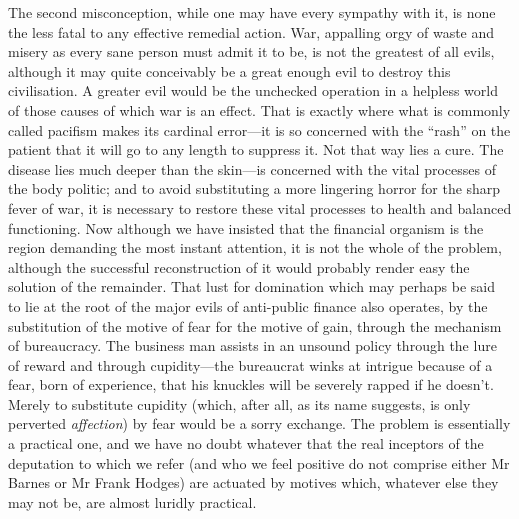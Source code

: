 \documentclass{book}
\begin{document}
The second misconception, while one may have every sympathy with it, is none the less fatal to any effective remedial action. War, appalling orgy of waste and misery as every sane person must admit it to be, is not the greatest of all evils, although it may quite conceivably be a great enough evil to destroy this civilisation. A greater evil would be the unchecked operation in a helpless world of those causes of which war is an effect. That is exactly where what is commonly called pacifism makes its cardinal error—it is so concerned with the “rash” on the patient that it will go to any length to suppress it. Not that way lies a cure. The disease lies much deeper than the skin—is concerned with the vital processes of the body politic; and to avoid substituting a more lingering horror for the sharp fever of war, it is necessary to restore these vital processes to health and balanced functioning. Now although we have insisted that the financial organism is the region demanding the most instant attention, it is not the whole of the problem, although the successful reconstruction of it would probably render easy the solution of the remainder. That lust for domination which may perhaps be said to lie at the root of the major evils of anti-public finance also operates, by the substitution of the motive of fear for the motive of gain, through the mechanism of bureaucracy. The business man assists in an unsound policy through the lure of reward and through cupidity—the bureaucrat winks at intrigue because of a fear, born of experience, that his knuckles will be severely rapped if he doesn't. Merely to substitute cupidity (which, after all, as its name suggests, is only perverted \emph{affection}) by fear would be a sorry exchange. The problem is essentially a practical one, and we have no doubt whatever that the real inceptors of the deputation to which we refer (and who we feel positive do not comprise either Mr Barnes or Mr Frank Hodges) are actuated by motives which, whatever else they may not be, are almost luridly practical.
\end{document}
